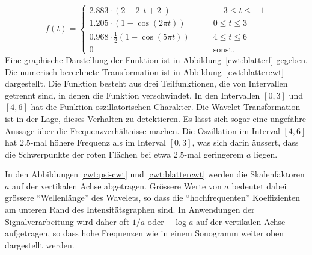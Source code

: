 \begin{beispiel}
\begin{equation}
f(t) = \begin{cases}
2.883 \cdot (2 - 2\,|t+2|)&\qquad -3\le t \le -1\\
1.205\cdot (1-\cos(2\pi t))&\qquad 0\le t \le 3\\
0.968\cdot \frac12(1-\cos(5\pi t))&\qquad 4\le t \le 6\\
0&\qquad\text{sonst.}
\end{cases}
\label{cwt:blatterf}
\end{equation}
Eine graphische Darstellung der Funktion ist in Abbildung~\ref{cwt:blatterf}
gegeben.
Die numerisch berechnete Transformation ist in Abbildung~\ref{cwt:blattercwt}
dargestellt.
Die Funktion besteht aus drei Teilfunktionen, die von Intervallen getrennt sind,
in denen die Funktion verschwindet.
In den Intervallen $[0,3]$ und $[4,6]$ hat die Funktion oszillatorischen
Charakter.
Die Wavelet-Transformation ist in der Lage, dieses Verhalten zu detektieren.
Es lässt sich sogar eine ungefähre Aussage über die Frequenzverhältnisse
machen.
Die Oszillation im Interval $[4,6]$ hat $2.5$-mal höhere Frequenz als im
Interval $[0,3]$, was sich darin äussert, dass die Schwerpunkte der roten
Flächen bei etwa $2.5$-mal geringerem $a$ liegen.
\end{beispiel}

In den Abbildungen \ref{cwt:psi-cwt} und \ref{cwt:blattercwt} werden 
die Skalenfaktoren $a$ auf der vertikalen Achse abgetragen.
Grössere Werte von $a$ bedeutet dabei grössere ``Wellenlänge'' des Wavelets,
so dass die ``hochfrequenten'' Koeffizienten am unteren Rand des
Intensitätsgraphen sind.
In Anwendungen der Signalverarbeitung wird daher oft $1/a$ oder $-\log a$ 
auf der vertikalen Achse aufgetragen, so dass hohe Frequenzen wie in
einem Sonogramm weiter oben dargestellt werden.


